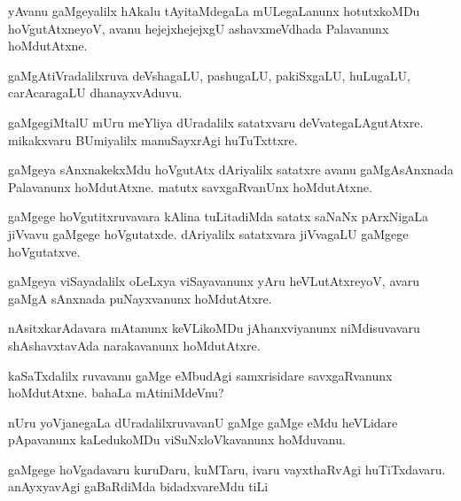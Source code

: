 \documentclass{article}
\begin{document}
\begin{mng}%
yAvanu gaMgeyalilx hAkalu tAyitaMdegaLa mULegaLanunx hotutxkoMDu hoVgutAtxneyoV, avanu hejejxhejejxgU ashavxmeVdhada Palavanunx hoMdutAtxne.
\end{mng}

\begin{mng}%
gaMgAtiVradalilxruva deVshagaLU, pashugaLU, pakiSxgaLU, huLugaLU, carAcaragaLU dhanayxvAduvu.
\end{mng}

\begin{mng}%
gaMgegiMtalU mUru meYliya dUradalilx satatxvaru deVvategaLAgutAtxre. mikakxvaru BUmiyalilx manuSayxrAgi huTuTxttxre.
\end{mng}

\begin{mng}%
gaMgeya sAnxnakekxMdu hoVgutAtx dAriyalilx satatxre avanu gaMgAsAnxnada Palavanunx hoMdutAtxne. matutx savxgaRvanUnx hoMdutAtxne.
\end{mng}

\begin{mng}%
gaMgege hoVgutitxruvavara kAlina tuLitadiMda satatx saNaNx pArxNigaLa jiVvavu gaMgege hoVgutatxde. dAriyalilx satatxvara jiVvagaLU gaMgege hoVgutatxve.
\end{mng}

\begin{mng}%
gaMgeya viSayadalilx oLeLxya viSayavanunx yAru heVLutAtxreyoV, avaru gaMgA sAnxnada puNayxvanunx hoMdutAtxre.
\end{mng}

\begin{mng}%
nAsitxkarAdavara mAtanunx keVLikoMDu jAhanxviyanunx niMdisuvavaru shAshavxtavAda narakavanunx hoMdutAtxre.
\end{mng}

\begin{mng}%
kaSaTxdalilx ruvavanu gaMge eMbudAgi samxrisidare savxgaRvanunx hoMdutAtxne. bahaLa mAtiniMdeVnu?
\end{mng}

\begin{mng}%
nUru yoVjanegaLa dUradalilxruvavanU gaMge gaMge eMdu heVLidare pApavanunx kaLedukoMDu viSuNxloVkavanunx hoMduvanu.
\end{mng}

\begin{mng}%
gaMgege hoVgadavaru kuruDaru, kuMTaru, ivaru vayxthaRvAgi huTiTxdavaru. anAyxyavAgi gaBaRdiMda bidadxvareMdu tiLi
\end{mng}
\end{document}
